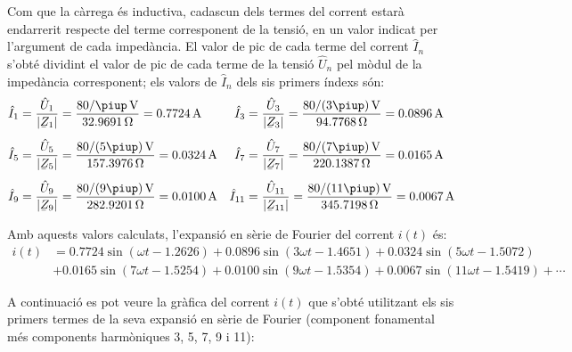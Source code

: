 \begin{exemple}
    Com que la càrrega és inductiva, cadascun dels
    termes del corrent estarà endarrerit respecte del terme corresponent
    de la tensió, en un valor indicat per l'argument de cada impedància.
    El valor de pic de cada terme del corrent $\hat{I}_n$ s'obté
    dividint el valor de pic de cada terme de la tensió $\hat{U}_n$ pel
    mòdul de la impedància corresponent; els valors de $\hat{I}_n$ dels sis primers índexs són:
    \begin{align*}
        \hat{I}_1 &= \frac{\hat{U}_1}{|\cmplx{Z}_1|} = \frac{80/\piup\unit{\,V}}{\qty{32,9691}{\ohm}} = \qty{0,7724}{A}
        & \hat{I}_3 &= \frac{\hat{U}_3}{|\cmplx{Z}_3|} =\frac{80/(3\piup)\unit{\,V}}{\qty{94,7768}{\ohm}} = \qty{0,0896}{A}\\[1ex]
        \hat{I}_5 &= \frac{\hat{U}_5}{|\cmplx{Z}_5|} =\frac{80/(5\piup)\unit{\,V}}{\qty{157,3976}{\ohm}} =\qty{0,0324}{A}
        & \hat{I}_7 &= \frac{\hat{U}_7}{|\cmplx{Z}_7|} =\frac{80/(7\piup)\unit{\,V}}{\qty{220,1387}{\ohm}} =
        \qty{0,0165}{A}\\[1ex]
        \hat{I}_9 &= \frac{\hat{U}_9}{|\cmplx{Z}_9|} =\frac{80/(9\piup)\unit{\,V}}{\qty{282,9201}{\ohm}} =
        \qty{0,0100}{A} & \hat{I}_{11} &= \frac{\hat{U}_{11}}{|\cmplx{Z}_{11}|} =\frac{80/(11\piup)\unit{\,V}}
        {\qty{345,7198}{\ohm}} =  \qty{0,0067}{A}
    \end{align*}

    Amb aquests valors calculats, l'expansió en sèrie de Fourier del
    corrent $i(t)$ és:
    \[\begin{split}
         i(t) &=  \num{0,7724} \sin(\omega t - \num{1,2626}) +  \num{0,0896} \sin(3 \omega t -
         \num{1,4651}) + \num{0,0324} \sin(5 \omega t - \num{1,5072}) \\
         &+ \num{0,0165} \sin(7 \omega t - \num{1,5254}) + \num{0,0100} \sin(9 \omega t - \num{1,5354})
         + \num{0,0067} \sin(11 \omega t - \num{1,5419}) +\cdots
    \end{split}\]

    A continuació es pot veure la gràfica del corrent $i(t)$ que
    s'obté utilitzant els sis primers termes de la seva expansió en
    sèrie de Fourier (component fonamental més components harmòniques 3, 5, 7, 9 i 11):

    \begin{center}
      
    \end{center}


\end{exemple}

